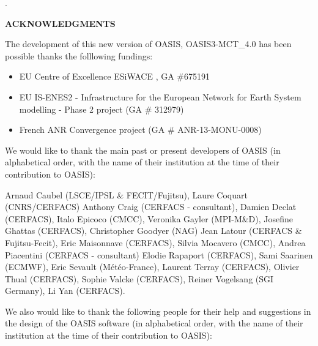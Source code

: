 \newpage
.

\vspace{3cm}

{\bf ACKNOWLEDGMENTS}
 
\vspace{1.5cm}
The development of this new version of OASIS, OASIS3-MCT\_4.0 has been
possible thanks the folllowing fundings:
\begin{itemize}
\item   EU Centre of Excellence ESiWACE , GA \#675191
\item EU IS-ENES2 - Infrastructure for the European Network for Earth
System modelling - Phase 2 project (GA \# 312979)
\item French ANR Convergence project (GA \# ANR-13-MONU-0008)
\end{itemize}
\vspace{0.5cm} 

 We would like to thank the main past or present developers of OASIS (in alphabetical order, with the name of their institution at the time of their contribution to OASIS):

Arnaud Caubel (LSCE/IPSL \& FECIT/Fujitsu),
Laure Coquart (CNRS/CERFACS)
Anthony Craig (CERFACS - consultant),
Damien Declat (CERFACS),
Italo Epicoco (CMCC),
Veronika Gayler (MPI-M\&D),
Josefine Ghattas (CERFACS),
Christopher Goodyer (NAG)
Jean Latour (CERFACS \& Fujitsu-Fecit),
Eric Maisonnave (CERFACS),
Silvia Mocavero (CMCC),
Andrea Piacentini (CERFACS -  consultant)
Elodie Rapaport (CERFACS),
Sami Saarinen (ECMWF),
Eric Sevault (M\'et\'eo-France),
Laurent Terray (CERFACS),
Olivier Thual (CERFACS),
Sophie Valcke (CERFACS),
Reiner Vogelsang (SGI Germany),
Li Yan (CERFACS).

\vspace{0.5cm}
We also would like to thank the following people for their help
and suggestions in the design of the OASIS software (in alphabetical
order, with the name of their institution at the time of their contribution to OASIS):

